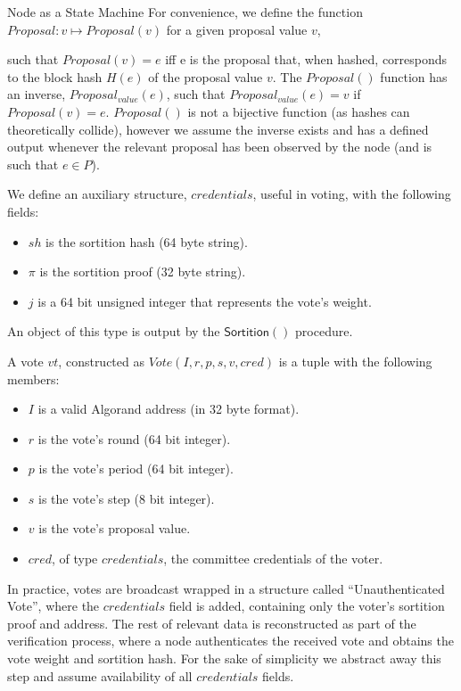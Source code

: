 \documentclass[10pt,a4paper]{article}
\begin{document}
\begin{section}{Node as a State Machine}
For convenience, we define the function $Proposal:v\mapsto{Proposal}(v)$ for a given proposal value 
$v$,

such that $Proposal(v) = e$ iff e is the proposal that, when hashed, corresponds to the block hash $H(e)$ of the proposal
value $v$. The $Proposal()$ function has an inverse, $Proposal_{value}(e)$, such that
$Proposal_{value}(e) = v$ if $Proposal(v) = e$.
$Proposal()$ is not a bijective function (as hashes can theoretically collide), however we assume the inverse
exists and has a defined output whenever the relevant proposal has been observed by the node
(and is such that $e \in P$).



We define an auxiliary structure, $credentials$, useful in voting, with the following fields:
\begin{itemize}
    \item $sh$ is the sortition hash (64 byte string).
    \item $\pi$ is the sortition proof (32 byte string).
    \item $j$ is a 64 bit unsigned integer that represents the vote's weight.
\end{itemize}
An object of this type is output by the $\mathsf{Sortition}()$ procedure.

A vote $vt$, constructed as $Vote(I,r,p,s,v,cred)$ is a tuple with the following members:
\begin{itemize}
    \item $I$ is a valid Algorand address (in 32 byte format).
    \item $r$ is the vote's round (64 bit integer).
    \item $p$ is the vote's period (64 bit integer).
    \item $s$ is the vote's step (8 bit integer).
    \item $v$ is the vote's proposal value.
    \item $cred$, of type $credentials$, the committee credentials of the voter.
\end{itemize}

In practice, votes are broadcast wrapped in a structure called ``Unauthenticated Vote'', 
where the $credentials$ field is added, containing only the voter's sortition proof and 
address.
The rest of relevant data is reconstructed as part of the verification process, 
where a node authenticates the received vote and obtains the vote weight and sortition hash.
For the sake of simplicity we abstract away this step and assume availability of all 
$credentials$ fields.



\end{section}
\end{document}
